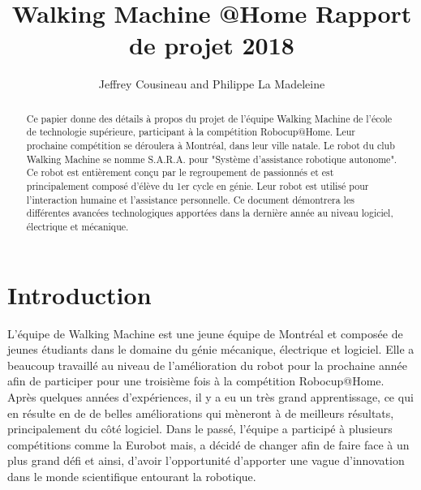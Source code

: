 \documentclass[runningheads,a4paper]{llncs}
\begin{document}


\newif\ifdraft
\draftfalse


\ifdraft
\setlength{\belowcaptionskip}{-5pt}
\fi

\title{Walking Machine @Home \newline \: Rapport de projet 2018}

\author{Jeffrey Cousineau and Philippe La Madeleine}
\maketitle



\begin{abstract}
Ce papier donne des détails à propos du projet de l'équipe Walking Machine de l'école de technologie supérieure, participant à la compétition Robocup@Home.  Leur prochaine compétition se déroulera à Montréal, dans leur ville natale. Le robot du club Walking Machine se nomme S.A.R.A. pour "Système d'assistance robotique autonome". Ce robot est entièrement conçu par le regroupement de passionnés et est principalement composé d'élève du 1er cycle en génie. Leur robot est utilisé pour l'interaction humaine et l'assistance personnelle. Ce document démontrera les différentes avancées technologiques apportées dans la dernière année au niveau logiciel, électrique et mécanique.

\end{abstract}


\section{Introduction}

L'équipe de Walking Machine est une jeune équipe de Montréal et composée de jeunes étudiants dans le domaine du génie mécanique, électrique et logiciel. Elle a beaucoup travaillé au niveau de l'amélioration du robot pour la prochaine année afin de participer pour une troisième fois à la compétition Robocup@Home. Après quelques années d'expériences, il y a eu un très grand apprentissage, ce qui en résulte en de de belles améliorations qui mèneront à de meilleurs résultats, principalement du côté logiciel. Dans le passé, l'équipe a participé à plusieurs compétitions comme la Eurobot mais, a décidé de changer afin de faire face à un plus grand défi et ainsi, d'avoir l'opportunité d'apporter une vague d'innovation dans le monde scientifique entourant la robotique. \\
\end{document}
